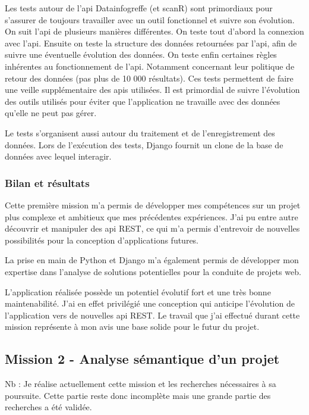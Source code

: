\documentclass[french]{article}
\begin{document}
{Les tests autour de l'api Datainfogreffe (et scanR) sont primordiaux pour s'assurer de toujours travailler avec un outil fonctionnel et suivre son évolution. On suit l'api de plusieurs manières différentes. On teste tout d'abord la connexion avec l'api. 
\newline{}
Ensuite on teste la structure des données retournées par l'api, afin de suivre une éventuelle évolution des données.
\newline{}
On teste enfin certaines règles inhérentes au fonctionnement de l'api. Notamment concernant leur politique de retour des données (pas plus de 10 000 résultats). 
\newline{}
Ces tests permettent de faire une veille supplémentaire des apis utilisées. Il est primordial de suivre l'évolution des outils utilisés pour éviter que l'application ne travaille avec des données qu'elle ne peut pas gérer.

Le tests s'organisent aussi autour du traitement et de l'enregistrement des données. Lors de l'exécution des tests, Django fournit un clone de la base de données avec lequel interagir.

\subsubsection{Bilan et résultats}

Cette première mission m'a permis de développer mes compétences sur un projet plus complexe et ambitieux que mes précédentes expériences. J'ai pu entre autre découvrir et manipuler des api REST, ce qui m'a permis d'entrevoir de nouvelles possibilités pour la conception d'applications futures.

La prise en main de Python et Django m'a également permis de développer mon expertise dans l'analyse de solutions potentielles pour la conduite de projets web.

L'application réalisée possède un potentiel évolutif fort et une très bonne maintenabilité. J'ai en effet privilégié une conception qui anticipe l'évolution de l'application vers de nouvelles api REST. Le travail que j'ai effectué durant cette mission représente à mon avis une base solide pour le futur du projet.

\subsection{Mission 2 - Analyse sémantique d'un projet}

Nb : Je réalise actuellement cette mission et les recherches nécessaires à sa poursuite. Cette partie reste donc incomplète mais une grande partie des recherches a été validée.

}
\end{document}
